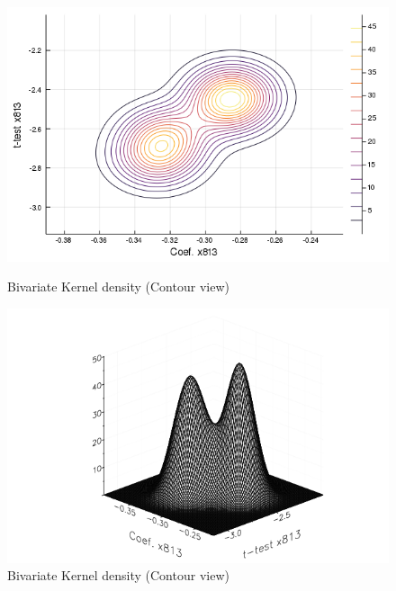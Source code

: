 \documentclass{article}
\begin{document}
\begin{figure}[!ht]
  \centering
  \begin{minipage}[b]{0.46\textwidth}
    \centering
    \includegraphics[width=\textwidth]{contour_x813_b_t.png}
    \caption{Bivariate Kernel density (Contour view)}
  \end{minipage}
  \hfill
  \begin{minipage}[b]{0.53\textwidth}
    \centering
    \includegraphics[width=\textwidth]{wireframe_x813_b_t.png}
    \caption{Bivariate Kernel density (Contour view)}
  \end{minipage}


\end{figure}
\end{document}
